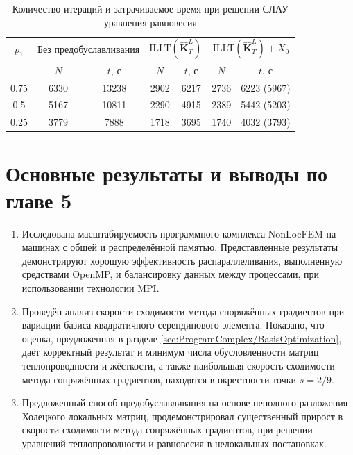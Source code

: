 \begin{table}[htbp]
    \centering
    \begin{threeparttable}%
        \caption{Количество итераций и затрачиваемое время при решении СЛАУ уравнения равновесия}\label{tab:StressPrecond}
        \begin{tabular}{|c|c|c|c|c|c|c|}
		\hline
		$p_1$ & \multicolumn{2}{c|}{Без предобуславливания} & \multicolumn{2}{c|}{ILLT$\left( \widehat{\textbf{K}}^L_T \right)$} & \multicolumn{2}{c|}{ILLT$\left( \widehat{\textbf{K}}^L_T \right) + X_0$}\\
		\cline{2-7}
		     & $N$ & $t$, с & $N$ & $t$, с & $N$ & $t$, с \\
		\hline
		0.75 & 6330 & 13238 & 2902 & 6217 & 2736 & 6223 (5967) \\
		\hline
		0.5  & 5167 & 10811 & 2290 & 4915 & 2389 & 5442 (5203) \\
		\hline
		0.25 & 3779 & 7888 & 1718 & 3695 & 1740 & 4032 (3793) \\
		\hline
        \end{tabular}
    \end{threeparttable}
\end{table}

\section{Основные результаты и выводы по главе 5}\label{sec:NonLocFEMAnalysis/Conclusion}

\begin{enumerate}
	\item Исследована масштабируемость программного комплекса NonLocFEM на машинах с общей и распределённой памятью. Представленные результаты демонстрируют хорошую эффективность распараллеливания, выполненную средствами OpenMP, и балансировку данных между процессами, при использовании технологии MPI.
	
	\item Проведён анализ скорости сходимости метода споряжённых градиентов при вариации базиса квадратичного серендипового элемента. Показано, что оценка, предложенная в разделе \ref{sec:ProgramComplex/BasisOptimization}, даёт корректный результат и минимум числа обусловленности матриц теплопроводности и жёсткости, а также наибольшая скорость сходимости метода сопряжённых градиентов, находятся в окрестности точки $s = 2/9$.
	
	\item Предложенный способ предобуславливания на основе неполного разложения Холецкого локальных матриц, продемонстрировал существенный прирост в скорости сходимости метода сопряжённых градиентов, при решении уравнений теплопроводности и равновесия в нелокальных постановках.
\end{enumerate}